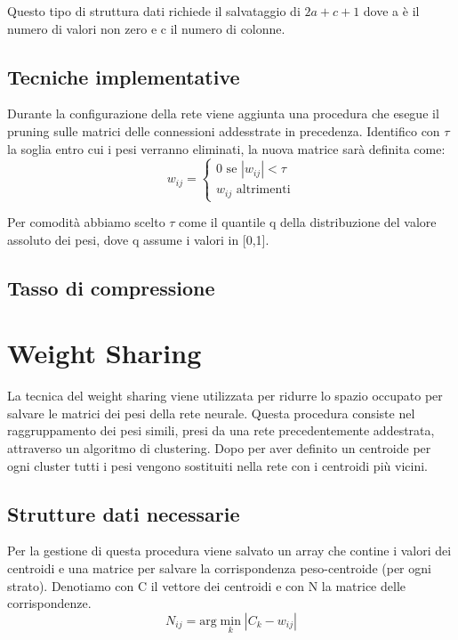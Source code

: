\documentclass[11pt,a4paper,twoside,
openright]{book}
\begin{document}
Questo tipo di struttura dati richiede il salvataggio di $2a+c+1$ dove a è il numero di valori non zero e c il numero di colonne.
\subsection{Tecniche implementative}
Durante la configurazione della rete viene aggiunta una procedura che esegue il pruning sulle matrici delle connessioni addesstrate in precedenza. Identifico con $\tau$ la soglia entro cui i pesi verranno eliminati, la nuova matrice sarà definita come:
\begin{equation}
w_{ij}=
\begin{cases}
0 \text{ se } |w_{ij}|<\tau \\
w_{ij} \text{ altrimenti}
\end{cases}
\label{pruning}
\end{equation}

Per comodità abbiamo scelto $\tau$ come il quantile q della distribuzione del valore assoluto dei pesi, dove q assume i valori in [0,1].

\subsection{Tasso di compressione}


\section{Weight Sharing}
La tecnica del weight sharing viene utilizzata per ridurre lo spazio occupato per salvare le matrici dei pesi della rete neurale. Questa procedura consiste nel raggruppamento dei pesi simili, presi da una rete precedentemente addestrata, attraverso un algoritmo di clustering. Dopo per aver definito un centroide per ogni cluster tutti i pesi vengono sostituiti nella rete con i centroidi più vicini.

\subsection{Strutture dati necessarie}
Per la gestione di questa procedura viene salvato un array che contine i valori dei centroidi e una matrice per salvare la corrispondenza peso-centroide (per ogni strato).
Denotiamo con C il vettore dei centroidi e con N la matrice delle corrispondenze.
\begin{equation}
N_{ij} = \text{arg}\min\limits_{k}|C_{k}-w_{ij}|
\label{ws}
\end{equation}
\end{document}
